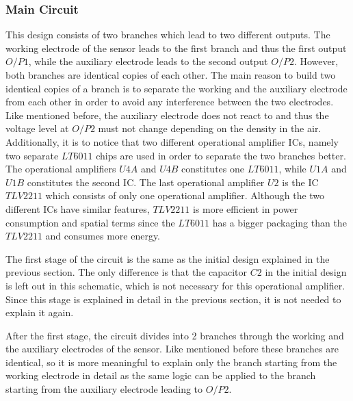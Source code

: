 \subsubsection{Main Circuit}
This design consists of two branches which lead to two different outputs. The working electrode of the sensor leads to the first branch and thus the first output $O/P1$, while the auxiliary electrode leads to the second output $O/P2$. However, both branches are identical copies of each other. The main reason to build two identical copies of a branch is to separate the working and the auxiliary electrode from each other in order to avoid any interference between the two electrodes. Like mentioned before, the auxiliary electrode does not react to  and thus the voltage level at $O/P2$ must not change depending on the  density in the air. Additionally, it is to notice that two different operational amplifier ICs, namely two separate $LT6011$ chips are used in order to separate the two branches better. The operational amplifiers $U4A$ and $U4B$ constitutes one $LT6011$, while $U1A$ and $U1B$ constitutes the second IC. The last operational amplifier $U2$ is the IC $TLV2211$ which consists of only one operational amplifier. Although the two different ICs have similar features, $TLV2211$ is more efficient in power consumption and spatial terms since the $LT6011$ has a bigger packaging than the $TLV2211$ and consumes more energy.\cite{TLV2211} \cite{LT6011}\par
The first stage of the circuit is the same as the initial design explained in the previous section. The only difference is that the capacitor $C2$ in the initial design is left out in this schematic, which is not necessary for this operational amplifier.\cite{2009} Since this stage is explained in detail in the previous section, it is not needed to explain it again. \par 
After the first stage, the circuit divides into 2 branches through the working and the auxiliary electrodes of the sensor. Like mentioned before these branches are identical, so it is more meaningful to explain only the branch starting from the working electrode in detail as the same logic can be applied to the branch starting from the auxiliary electrode leading to $O/P2$.\par
